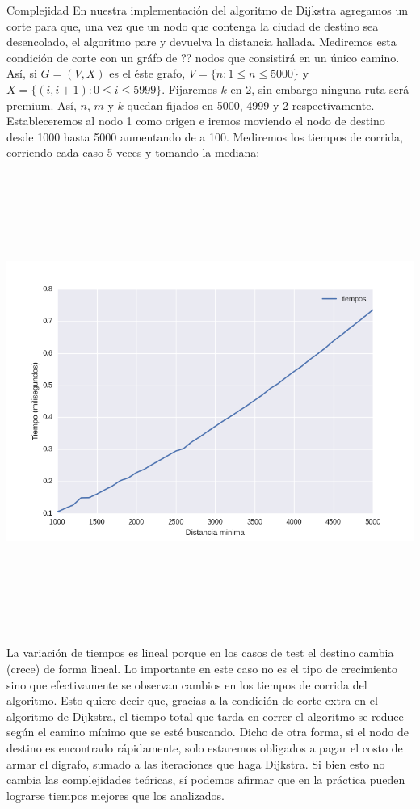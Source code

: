\begin{subsection}{Complejidad}
En nuestra implementación del algoritmo de Dijkstra agregamos un corte para que, una vez que un nodo que contenga la ciudad de destino sea desencolado, el algoritmo pare y devuelva la distancia hallada. Mediremos esta condición de corte con un gráfo de ?? nodos que consistirá en un único camino. Así, si $G=(V,X)$ es el éste grafo, $V=\{n: 1 \leq n \leq 5000\}$ y $X=\{ (i, i+1) : 0 \leq i \leq 5999 \}$. Fijaremos $k$ en 2, sin embargo ninguna ruta será premium. Así, $n$, $m$ y $k$ quedan fijados en 5000, 4999 y 2 respectivamente. Estableceremos al nodo 1 como origen e iremos moviendo el nodo de destino desde 1000 hasta 5000 aumentando de a 100. Mediremos los tiempos de corrida, corriendo cada caso 5 veces y tomando la mediana:

\includegraphics[width=15cm,height=15cm,keepaspectratio]{img/caso_dist.png}

La variación de tiempos es lineal porque en los casos de test el destino cambia (crece) de forma lineal. Lo importante en este caso no es el tipo de crecimiento sino que efectivamente se observan cambios en los tiempos de corrida del algoritmo. Esto quiere decir que, gracias a la condición de corte extra en el algoritmo de Dijkstra, el tiempo total que tarda en correr el algoritmo se reduce según el camino mínimo que se esté buscando. Dicho de otra forma, si el nodo de destino es encontrado rápidamente, solo estaremos obligados a pagar el costo de armar el digrafo, sumado a las iteraciones que haga Dijkstra. Si bien esto no cambia las complejidades teóricas, sí podemos afirmar que en la práctica pueden lograrse tiempos mejores que los analizados. 






\end{subsection}

